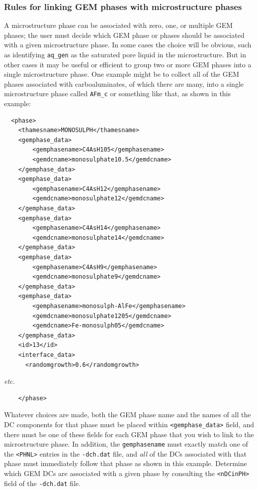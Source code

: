 \documentclass{article}
\begin{document}
\normalsize{ }
\subsubsection{Rules for linking GEM phases with microstructure phases}
A microstructure phase can be associated with zero, one, or multiple GEM phases;
the user must decide which GEM phase or phases
should be associated with a given microstructure phase.  In some cases the choice
will be obvious, such as identifying \verb!aq_gen! as the saturated pore
liquid in the microstructure.  But in other cases it may be useful or efficient to
group two or more GEM phases into a single microstructure phase.  One example
might be to collect all of the GEM phases associated with carboaluminates, of which
there are many, into a single microstructure phase called \verb!AFm_c! or something
like that, as shown in this example:

\scriptsize{
    \begin{lstlisting}
  <phase>
    <thamesname>MONOSULPH</thamesname>
    <gemphase_data>
        <gemphasename>C4AsH105</gemphasename>
        <gemdcname>monosulphate10.5</gemdcname>
    </gemphase_data>
    <gemphase_data>
        <gemphasename>C4AsH12</gemphasename>
        <gemdcname>monosulphate12</gemdcname>
    </gemphase_data>
    <gemphase_data>
        <gemphasename>C4AsH14</gemphasename>
        <gemdcname>monosulphate14</gemdcname>
    </gemphase_data>
    <gemphase_data>
        <gemphasename>C4AsH9</gemphasename>
        <gemdcname>monosulphate9</gemdcname>
    </gemphase_data>
    <gemphase_data>
        <gemphasename>monosulph-AlFe</gemphasename>
        <gemdcname>monosulphate1205</gemdcname>
        <gemdcname>Fe-monosulph05</gemdcname>
    </gemphase_data>
    <id>13</id>
    <interface_data>
      <randomgrowth>0.6</randomgrowth>
    \end{lstlisting}

    \textit{etc.}

    \begin{lstlisting}
    </phase>
    \end{lstlisting}
}

\normalsize{ }
Whatever choices are made, both the GEM phase name and the names of all
the DC components for that phase must be placed within \verb!<gemphase_data>! field,
and there must be one of these fields for each GEM phase that you wish to link
to the microstructure phase.  In addition, the \verb!gemphasename! must exactly match
one of the \verb!<PHNL>! entries in the \verb!-dch.dat! file, and
\textit{all} of the DCs associated with that phase must immediately follow that
phase as shown in this example.  Determine which GEM DCs are associated
with a given phase by consulting the \verb!<nDCinPH>! field of the \verb!-dch.dat! file.
\end{document}
